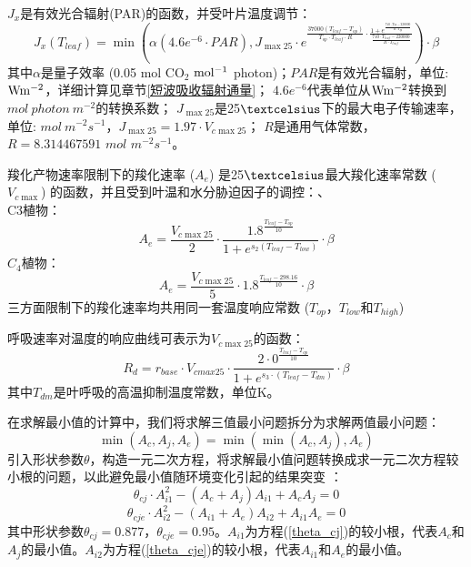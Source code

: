      
$J_x$是有效光合辐射(PAR)的函数，并受叶片温度调节：
\begin{equation}
J_{x}\left(T_{{leaf }}\right)=\min \left(\alpha\left(4.6 e^{-6} \cdot P A R\right), J_{\max 25}
 \cdot e^{\frac{37000\left(T_{{leaf }}-T_{o p}\right)}{T_{o p} \cdot T_{{leaf }} \cdot R} \cdot \frac{1+e^{\frac{710 \cdot T_{o p}-220000}
 {R \cdot T_{o p}}}}{\frac{710 \cdot T_{{leaf }}-220000}{R \cdot T_{{leaf }}}}}\right) \cdot \beta
\end{equation}
其中$\alpha$是量子效率 (0.05 mol CO$_2$ $\rm mol^{-1}$ photon)；$PAR$是有效光合辐射，单位: $\rm W m^{-2}$，详细计算见章节\ref{短波吸收辐射通量}；
$4.6e^{-6}$代表单位从$\rm W m^{-2}$转换到$mol\ photon\ m^{-2}$的转换系数；
$J_{\max 25}$是25$\rm \textcelsius$下的最大电子传输速率，单位: $mol\ m^{-2}s^{-1}$，$J_{\max 25}=1.97 \cdot V_{c \max 25}$； 
$R$是通用气体常数，$R=8.314467591$ $mol$ $m^{-2}s^{-1}$。


羧化产物速率限制下的羧化速率 ($A_e$) 是25$\textcelsius$最大羧化速率常数 ($V_{c \max}$) 的函数，并且受到叶温和水分胁迫因子的调控：、\\
C3植物：\\
\begin{equation}\label{A_e_a}
A_e=\frac{V_{c \max 25}}{2} \cdot \frac{1.8^{\frac{T_{{leaf }}-T_{o p}}{10}}}{1+e^{s_{2}\left(T_{{leaf }}-T_{{low }}\right)}} \cdot \beta
\end{equation}
$C_4$植物：\\
\begin{equation}\label{A_e_b}
A_e=\frac{V_{c \max 25}}{5} \cdot 1.8^{\frac{T_{{leaf }}-298.16}{10}} \cdot \beta
\end{equation}
三方面限制下的羧化速率均共用同一套温度响应常数 ($T_{op}$，$T_{low}$和$T_{high}$)


呼吸速率对温度的响应曲线可表示为$V_{c \max25}$的函数：
\begin{equation}\label{R_d1}
R_{d}=r_{{base }} \cdot V_{cmax 25} \cdot \frac{2 \cdot 0^{\frac{T_{leaf}-T_{op}}{10}}}{1+e^{s_3 \cdot\left(T_{leaf}-T_{d m}\right)}} \cdot \beta
\end{equation}
其中$T_{dm}$是叶呼吸的高温抑制温度常数，单位K。



在求解最小值的计算中，我们将求解三值最小问题拆分为求解两值最小问题：
\begin{equation}\label{min_Ac_Aj_Ae}
\min \left(A_{c}, A_{j}, A_{e}\right)=\min \left(\min \left(A_{c}, A_{j}\right), A_{e}\right)
\end{equation}
引入形状参数$\theta$，构造一元二次方程，将求解最小值问题转换成求一元二次方程较小根的问题，以此避免最小值随环境变化引起的结果突变 \citep{collatz1991,collatz1992}：
\begin{equation}\label{theta_cj}
\theta_{c j} \cdot A_{i1}^{2}-\left(A_{c}+A_{j}\right) A_{i1}+A_{c} A_{j}=0
\end{equation}
\begin{equation}\label{theta_cje}
\theta_{c j e} \cdot A_{i2}^{2}-\left(A_{i1}+A_{e}\right) A_{i2}+A_{i1} A_{e}=0
\end{equation}
其中形状参数$\theta_{cj}=0.877$，$\theta_{cje}=0.95$。$A_{i1}$为方程(\ref{theta_cj})的较小根，代表$A_c$和$A_j$的最小值。$A_{i2}$为方程(\ref{theta_cje})的较小根，代表$A_{i1}$和$A_e$的最小值。


